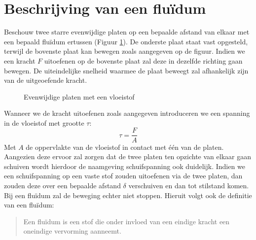 	\section{Beschrijving van een fluïdum}
	\label{sec:Beschrijving van een fluidum}
Beschouw twee starre evenwijdige platen op een bepaalde afstand van elkaar met een bepaald fluïdum ertussen (Figuur \ref{fig:Evenwijdige platen}). De onderste plaat staat vast opgesteld, terwijl de bovenste plaat kan bewegen zoals aangegeven op de figuur. Indien we een kracht $F$ uitoefenen op de bovenste plaat zal deze in dezelfde richting gaan bewegen. De uiteindelijke snelheid waarmee de plaat beweegt zal afhankelijk zijn van de uitgeoefende kracht.
\begin{figure}[htb]
	\centering
	
	\caption{Evenwijdige platen met een vloeistof }
	\label{fig:Evenwijdige platen}
\end{figure}
Wanneer we de kracht uitoefenen zoals aangegeven introduceren we een spanning in de vloeistof met grootte $\tau$:
\begin{equation}
	\tau = \frac{F}{A}
\end{equation}
Met $A$ de oppervlakte van de vloeistof in contact met één van de platen. Aangezien deze ervoor zal zorgen dat de twee platen ten opzichte van elkaar gaan schuiven wordt hierdoor de naamgeving schuifspanning ook duidelijk. Indien we een schuifspanning op een vaste stof zouden uitoefenen via de twee platen, dan zouden deze over een bepaalde afstand $\delta$ verschuiven en dan tot stilstand komen. Bij een fluïdum zal de beweging echter niet stoppen. Hieruit volgt ook de definitie van een fluïdum:

\begin{quotation}
	Een fluïdum is een stof die onder invloed van een eindige kracht een oneindige vervorming aanneemt.
\end{quotation}

